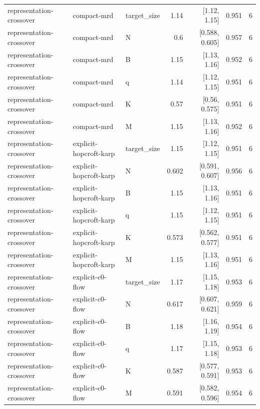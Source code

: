 \begin{table}[t]
\begin{tabular}{lllrrrr}
representation-crossover & compact-mrd & target_size & 1.14 & [1.12, 1.15] & 0.951 & 6 \\
representation-crossover & compact-mrd & N & 0.6 & [0.588, 0.605] & 0.957 & 6 \\
representation-crossover & compact-mrd & B & 1.15 & [1.13, 1.16] & 0.952 & 6 \\
representation-crossover & compact-mrd & q & 1.14 & [1.12, 1.15] & 0.951 & 6 \\
representation-crossover & compact-mrd & K & 0.57 & [0.56, 0.575] & 0.951 & 6 \\
representation-crossover & compact-mrd & M & 1.15 & [1.13, 1.16] & 0.952 & 6 \\
representation-crossover & explicit-hopcroft-karp & target_size & 1.15 & [1.12, 1.15] & 0.951 & 6 \\
representation-crossover & explicit-hopcroft-karp & N & 0.602 & [0.591, 0.607] & 0.956 & 6 \\
representation-crossover & explicit-hopcroft-karp & B & 1.15 & [1.13, 1.16] & 0.951 & 6 \\
representation-crossover & explicit-hopcroft-karp & q & 1.15 & [1.12, 1.15] & 0.951 & 6 \\
representation-crossover & explicit-hopcroft-karp & K & 0.573 & [0.562, 0.577] & 0.951 & 6 \\
representation-crossover & explicit-hopcroft-karp & M & 1.15 & [1.13, 1.16] & 0.951 & 6 \\
representation-crossover & explicit-c0-flow & target_size & 1.17 & [1.15, 1.18] & 0.953 & 6 \\
representation-crossover & explicit-c0-flow & N & 0.617 & [0.607, 0.621] & 0.959 & 6 \\
representation-crossover & explicit-c0-flow & B & 1.18 & [1.16, 1.19] & 0.954 & 6 \\
representation-crossover & explicit-c0-flow & q & 1.17 & [1.15, 1.18] & 0.953 & 6 \\
representation-crossover & explicit-c0-flow & K & 0.587 & [0.577, 0.591] & 0.953 & 6 \\
representation-crossover & explicit-c0-flow & M & 0.591 & [0.582, 0.596] & 0.954 & 6 \\
\bottomrule
\end{tabular}
\end{table}

